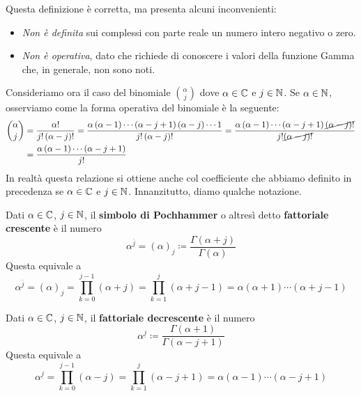 Questa definizione è corretta, ma presenta alcuni inconvenienti:
\begin{itemize}
	\item \textit{Non è definita} sui complessi con parte reale un numero intero negativo o zero.
	\item \textit{Non è operativa}, dato che richiede di conoscere i valori della funzione Gamma che, in generale, non sono noti.
\end{itemize}
Consideriamo ora il caso del binomiale $\displaystyle\binom{\alpha}{j}$ dove $\alpha\in\mathbb{C}$ e $j\in\mathbb{N}$. Se $\alpha\in\mathbb{N}$, osserviamo come la forma operativa del binomiale è la seguente:
\begin{align*}
	\binom{\alpha}{j}&=\frac{\alpha!}{j!\left(\alpha-j\right)!}=\frac{\alpha\left(\alpha-1\right)\cdots\left(\alpha-j+1\right)\left(\alpha-j\right)\cdots 1}{j!\left(\alpha-j\right)!}=\frac{\alpha\left(\alpha-1\right)\cdots\left(\alpha-j+1\right)\Ccancel{\left(\alpha-j\right)!}}{j!\Ccancel{\left(\alpha-j\right)!}}\\
	&=\frac{\alpha\left(\alpha-1\right)\cdots\left(\alpha-j+1\right)}{j!}
\end{align*}
In realtà questa relazione si ottiene anche col coefficiente che abbiamo definito in precedenza se $\alpha\in\mathbb{C}$ e $j\in\mathbb{N}$. Innanzitutto, diamo qualche notazione.
\begin{define}
	Dati $\alpha\in\mathbb{C}$, $j\in\mathbb{N}$, il \textbf{simbolo di Pochhammer} o altresì detto \textbf{fattoriale crescente} è il numero
	\begin{equation}
		\alpha^{\overline{j}}=\left(\alpha\right)_j\coloneqq\frac{\Gamma\left(\alpha+j\right)}{\Gamma\left(\alpha\right)}
	\end{equation}
	Questa equivale a
	\begin{equation}
	\alpha^{\overline{j}}=\left(\alpha\right)_j=\prod_{k=0}^{j-1}\left(\alpha+j\right)=\prod_{k=1}^{j}\left(\alpha+j-1\right)=\alpha\left(\alpha+1\right)\cdots\left(\alpha+j-1\right)
\end{equation}
\end{define}
\begin{define}
	Dati $\alpha\in\mathbb{C}$, $j\in\mathbb{N}$, il \textbf{fattoriale decrescente} è il numero
	\begin{equation}
		\alpha^{\underline{j}}\coloneqq\frac{\Gamma\left(\alpha+1\right)}{\Gamma\left(\alpha-j+1\right)}
	\end{equation}
	Questa equivale a
	\begin{equation}
	\alpha^{\underline{j}}=\prod_{k=0}^{j-1}\left(\alpha-j\right)=\prod_{k=1}^{j}\left(\alpha-j+1\right)=\alpha\left(\alpha-1\right)\cdots\left(\alpha-j+1\right)
\end{equation}
\end{define}

